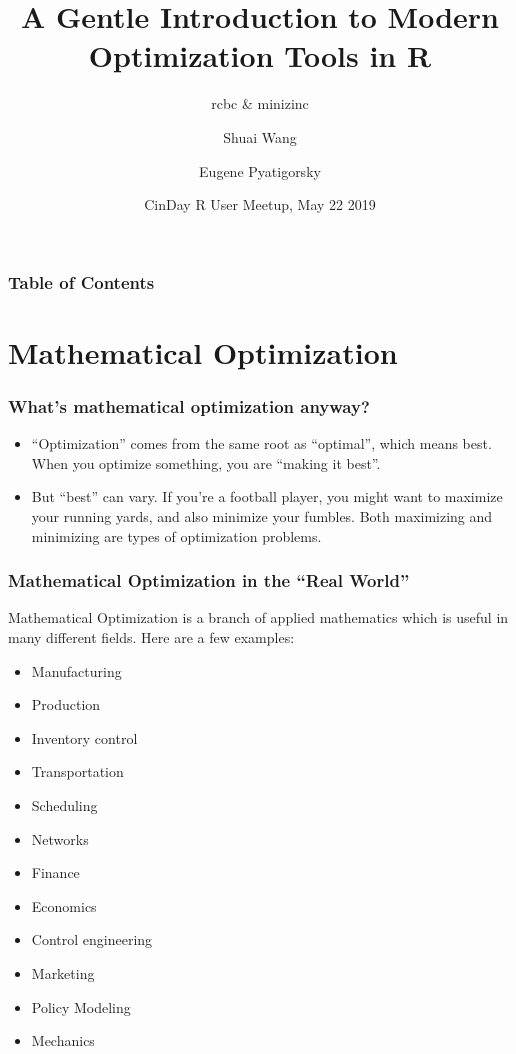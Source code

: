 \documentclass[xcolor=dvipsnames,aspectratio=169]{beamer}
\title[]{A Gentle Introduction to Modern Optimization Tools in R}
\subtitle{rcbc \& minizinc 
}
\author[SW;EP]{Shuai Wang \and Eugene Pyatigorsky}
\institute[84.51] %
{84.51 Operations Research}
\date[5/22/2019] %
{CinDay R User Meetup, May 22 2019}
\begin{document}
\frame{\titlepage}


\begin{frame}
\frametitle{Table of Contents}
\tableofcontents
\end{frame}


\section{Mathematical Optimization}

\begin{frame}
\frametitle{What's mathematical optimization anyway?}

\begin{itemize}
    \item “Optimization” comes from the same root as “optimal”, which means best. When you
optimize something, you are “making it best”.
 
 
\item But “best” can vary. If you’re a football player, you might want to maximize your
running yards, and also minimize your fumbles. Both maximizing and minimizing are types
of optimization problems.
\end{itemize}



\end{frame}



\begin{frame}
\frametitle{Mathematical Optimization in the “Real World”}
Mathematical Optimization is a branch of applied mathematics which is useful in many different fields. Here are a few examples:
 \begin{multicols}{2}
    \begin{itemize}
        \item Manufacturing
        \item Production
        \item Inventory control
        \item Transportation
        \item Scheduling
        \item Networks
        \item Finance
        \item Economics
        \item Control engineering
        \item Marketing
        \item Policy Modeling
        \item Mechanics
    \end{itemize}
    \end{multicols}

\end{frame}
\end{document}
